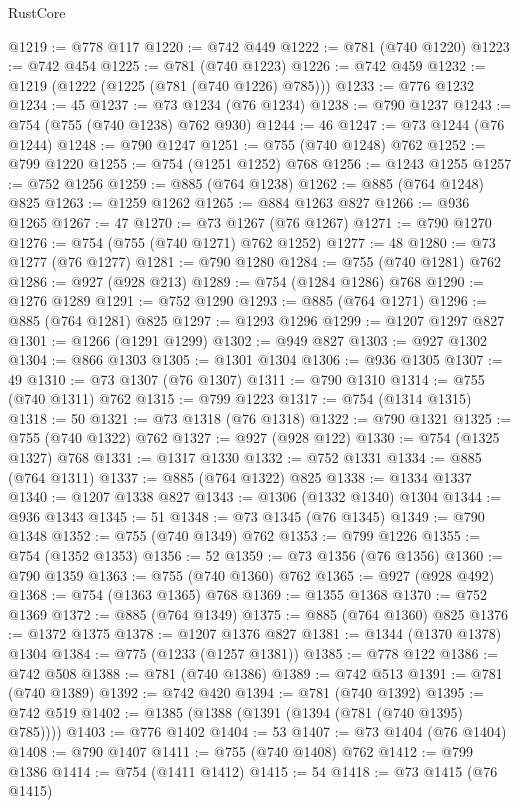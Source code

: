 \begin{lexlean}{RustCore}
\begin{coremodule}
@1219 := @778 @117
@1220 := @742 @449
@1222 := @781 (@740 @1220)
@1223 := @742 @454
@1225 := @781 (@740 @1223)
@1226 := @742 @459
@1232 := @1219 (@1222 (@1225 (@781 (@740 @1226) @785)))
@1233 := @776 @1232
@1234 := 45
@1237 := @73 @1234 (@76 @1234)
@1238 := @790 @1237
@1243 := @754 (@755 (@740 @1238) @762 @930)
@1244 := 46
@1247 := @73 @1244 (@76 @1244)
@1248 := @790 @1247
@1251 := @755 (@740 @1248) @762
@1252 := @799 @1220
@1255 := @754 (@1251 @1252) @768
@1256 := @1243 @1255
@1257 := @752 @1256
@1259 := @885 (@764 @1238)
@1262 := @885 (@764 @1248) @825
@1263 := @1259 @1262
@1265 := @884 @1263 @827
@1266 := @936 @1265
@1267 := 47
@1270 := @73 @1267 (@76 @1267)
@1271 := @790 @1270
@1276 := @754 (@755 (@740 @1271) @762 @1252)
@1277 := 48
@1280 := @73 @1277 (@76 @1277)
@1281 := @790 @1280
@1284 := @755 (@740 @1281) @762
@1286 := @927 (@928 @213)
@1289 := @754 (@1284 @1286) @768
@1290 := @1276 @1289
@1291 := @752 @1290
@1293 := @885 (@764 @1271)
@1296 := @885 (@764 @1281) @825
@1297 := @1293 @1296
@1299 := @1207 @1297 @827
@1301 := @1266 (@1291 @1299)
@1302 := @949 @827
@1303 := @927 @1302
@1304 := @866 @1303
@1305 := @1301 @1304
@1306 := @936 @1305
@1307 := 49
@1310 := @73 @1307 (@76 @1307)
@1311 := @790 @1310
@1314 := @755 (@740 @1311) @762
@1315 := @799 @1223
@1317 := @754 (@1314 @1315)
@1318 := 50
@1321 := @73 @1318 (@76 @1318)
@1322 := @790 @1321
@1325 := @755 (@740 @1322) @762
@1327 := @927 (@928 @122)
@1330 := @754 (@1325 @1327) @768
@1331 := @1317 @1330
@1332 := @752 @1331
@1334 := @885 (@764 @1311)
@1337 := @885 (@764 @1322) @825
@1338 := @1334 @1337
@1340 := @1207 @1338 @827
@1343 := @1306 (@1332 @1340) @1304
@1344 := @936 @1343
@1345 := 51
@1348 := @73 @1345 (@76 @1345)
@1349 := @790 @1348
@1352 := @755 (@740 @1349) @762
@1353 := @799 @1226
@1355 := @754 (@1352 @1353)
@1356 := 52
@1359 := @73 @1356 (@76 @1356)
@1360 := @790 @1359
@1363 := @755 (@740 @1360) @762
@1365 := @927 (@928 @492)
@1368 := @754 (@1363 @1365) @768
@1369 := @1355 @1368
@1370 := @752 @1369
@1372 := @885 (@764 @1349)
@1375 := @885 (@764 @1360) @825
@1376 := @1372 @1375
@1378 := @1207 @1376 @827
@1381 := @1344 (@1370 @1378) @1304
@1384 := @775 (@1233 (@1257 @1381))
@1385 := @778 @122
@1386 := @742 @508
@1388 := @781 (@740 @1386)
@1389 := @742 @513
@1391 := @781 (@740 @1389)
@1392 := @742 @420
@1394 := @781 (@740 @1392)
@1395 := @742 @519
@1402 := @1385 (@1388 (@1391 (@1394 (@781 (@740 @1395) @785))))
@1403 := @776 @1402
@1404 := 53
@1407 := @73 @1404 (@76 @1404)
@1408 := @790 @1407
@1411 := @755 (@740 @1408) @762
@1412 := @799 @1386
@1414 := @754 (@1411 @1412)
@1415 := 54
@1418 := @73 @1415 (@76 @1415)

\end{coremodule}
\end{lexlean}
